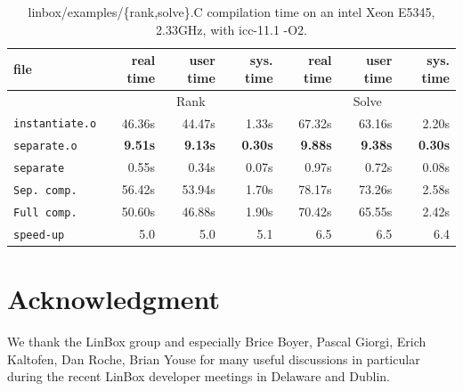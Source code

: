 \documentclass{article}
\newcommand{\linbox}{{\sc LinBox}\xspace}
\begin{document}
\begin{table}[ht]\center
\begin{tabular}{|l||r|r|r||r|r|r|}
\hline
file                      &  real time   &  user time   &  sys. time  &  real time   &  user time   &  sys. time \\
\hline
 & \multicolumn{3}{|c||}{Rank}& \multicolumn{3}{|c|}{Solve}\\
\hline
\texttt{instantiate.o} & 46.36s & 44.47s & 1.33s & 67.32s & 63.16s & 2.20s\\
\texttt{separate.o} & \bf 9.51s & \bf 9.13s & \bf 0.30s & \bf 9.88s & \bf 9.38s & \bf 0.30s\\
\texttt{separate} & 0.55s & 0.34s & 0.07s & 0.97s & 0.72s & 0.08s\\
\hline
\texttt{Sep. comp.} & 56.42s & 53.94s & 1.70s & 78.17s & 73.26s & 2.58s\\
\hline
\texttt{Full comp.} & 50.60s & 46.88s & 1.90s & 70.42s & 65.55s & 2.42s\\
\hline
\hline
\texttt{speed-up} & 5.0 & 5.0 & 5.1 & 6.5 & 6.5 & 6.4\\
\hline
\end{tabular} 
\caption{linbox/examples/\{rank,solve\}.C compilation time on an intel
  Xeon E5345, 2.33GHz, with icc-11.1 -O2.}\label{tab:compintel}
\end{table}


\section*{Acknowledgment}
We thank the \linbox group and especially Brice Boyer, Pascal Giorgi,
Erich Kaltofen, Dan Roche, Brian Youse for many useful discussions 
in particular during the recent \linbox developer meetings in
Delaware and Dublin.
%

 
%
\end{document}
